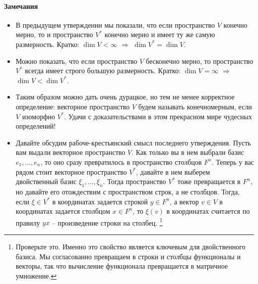 \paragraph{Замечания}

\begin{itemize}
\item В предыдущем утверждении мы показали, что если пространство $V$ конечно мерно, то и пространство $V^*$ конечно мерно и имеет ту же самую размерность.
Кратко:  $\dim V <\infty$ $\Rightarrow$ $\dim V^* = \dim V$.

\item Можно показать, что если пространство $V$ бесконечно мерно, то пространство $V^*$ всегда имеет строго большую размерность.
Кратко: $\dim V = \infty$ $\Rightarrow$ $\dim V < \dim V^*$.

\item Таким образом можно дать очень дурацкое, но тем не менее корректное определение: векторное пространство $V$ будем называть конечномерным, если $V$ изоморфно $V^*$.
Удачи с доказательствами в этом прекрасном мире чудесных определений!

\item Давайте обсудим рабоче-крестьянский смысл последнего утверждения.
Пусть вам выдали векторное пространство $V$.
Как только вы в нем выбрали базис $e_1,\ldots,e_n$, то оно сразу превратилось в пространство столбцов $F^n$.
Теперь у вас рядом стоит векторное пространство $V^*$, давайте в нем выберем двойственный базис $\xi_1,\ldots,\xi_n$.
Тогда пространство $V^*$ тоже превращается в $F^n$, но давайте его отождествим с пространством строк, а не столбцов.
Тогда, если $\xi \in V^*$ в координатах задается строкой $y\in F^n$, а вектор $v\in V$ в координатах задается столбцом $x\in F^n$, то $\xi(v)$ в координатах считается по правилу $yx$ -- произведение строки на столбец.%
\footnote{Проверьте это.
Именно это свойство является ключевым для двойственного базиса.
Мы согласованно превращаем в строки и столбцы функционалы и векторы, так что вычисление функционала превращается в матричное умножение.}
\end{itemize}


